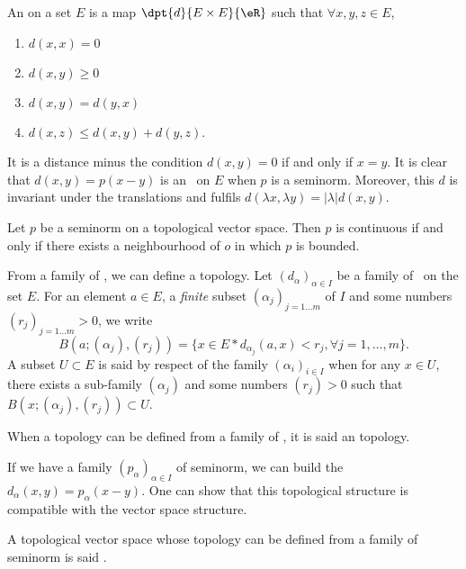 \begin{definition}
An  on a set $E$ is a map $\dpt{d}{E\times E}{\eR}$ such that $\forall x,y,z\in E$,
\begin{enumerate}
\item $d(x,x)=0$
\item $d(x,y)\geq 0$
\item $d(x,y)=d(y,x)$
\item $d(x,z)\leq d(x,y)+d(y,z)$.
\end{enumerate}
\end{definition}
It is a distance minus the condition  $d(x,y)=0$ if and only if $x=y$.
It is clear that $d(x,y)=p(x-y)$ is an \ecart\ on $E$ when $p$ is a seminorm. Moreover, this $d$ is invariant under the translations and fulfils $d(\lambda x,\lambda y)=|\lambda|d(x,y)$.

\begin{proposition}
Let $p$ be a seminorm on a topological vector space. Then $p$ is continuous if and only if there exists a neighbourhood of $o$ in which $p$ is bounded.
\label{prop:semi_norm_cont} 
\end{proposition}


 From a family of \ecarts, we can define a topology. Let $(d_{\alpha})_{\alpha\in I}$ be a family of \ecarts\ on the set $E$. For an element $a\in E$, a \emph{finite} subset $(\alpha_j)_{j=1\ldots m}$ of $I$ and some numbers $(r_j)_{j=1\ldots m}>0$, we write
\[
  B(a; (\alpha_j),(r_j))=\{x\in E\ast d_{\alpha_j}(a,x)<r_j,\forall j=1,\ldots,m\}.
\]
\label{topo_semi_norm} A subset $U\subset E$ is said  by respect of the family $(\alpha_i)_{i\in I}$ when for any $x\in U$, there exists a sub-family $(\alpha_j)$ and some numbers $(r_j)>0$ such that $B(x;(\alpha_j),(r_j))\subset U$.

\begin{definition}
When a topology can be defined from a family of \ecarts, it is said an  topology.
\end{definition}

 If we have a family $(p_{\alpha})_{\alpha\in I}$ of seminorm, we can build the \ecarts\ $d_{\alpha}(x,y)=p_{\alpha}(x-y)$. One can show that this topological structure is compatible with the vector space structure.

\begin{definition}
 A topological vector space whose topology can be defined from a family of seminorm is said .
\end{definition}

